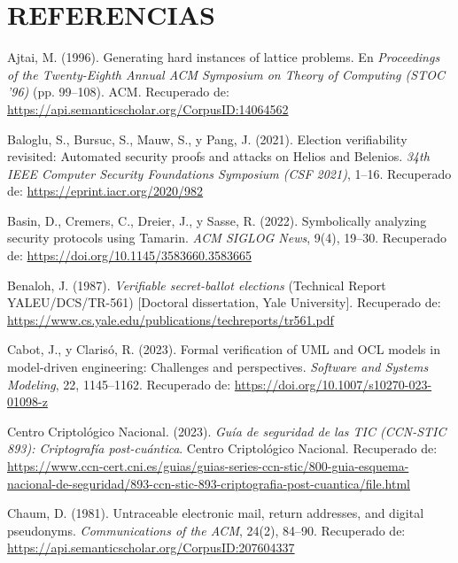 \clearpage
\chapter*{REFERENCIAS}
\begin{flushleft}
	\setlength{\parindent}{0pt}
	\setlength{\parskip}{12pt}

	\hangindent=1.25cm
	Ajtai, M. (1996). Generating hard instances of lattice problems. En \textit{Proceedings of the Twenty-Eighth Annual ACM Symposium on Theory of Computing (STOC '96)} (pp. 99--108). ACM. Recuperado de: \url{https://api.semanticscholar.org/CorpusID:14064562}

	\hangindent=1.25cm
	Baloglu, S., Bursuc, S., Mauw, S., y Pang, J. (2021). Election verifiability revisited: Automated security proofs and attacks on Helios and Belenios. \textit{34th IEEE Computer Security Foundations Symposium (CSF 2021)}, 1--16. Recuperado de: \url{https://eprint.iacr.org/2020/982}

	\hangindent=1.25cm
	Basin, D., Cremers, C., Dreier, J., y Sasse, R. (2022). Symbolically analyzing security protocols using Tamarin. \textit{ACM SIGLOG News}, 9(4), 19--30. Recuperado de: \url{https://doi.org/10.1145/3583660.3583665}

	\hangindent=1.25cm
	Benaloh, J. (1987). \textit{Verifiable secret-ballot elections} (Technical Report YALEU/DCS/TR-561) [Doctoral dissertation, Yale University]. Recuperado de: \url{https://www.cs.yale.edu/publications/techreports/tr561.pdf}

	\hangindent=1.25cm
	Cabot, J., y Clarisó, R. (2023). Formal verification of UML and OCL models in model-driven engineering: Challenges and perspectives. \textit{Software and Systems Modeling}, 22, 1145--1162. Recuperado de: \url{https://doi.org/10.1007/s10270-023-01098-z}

	\hangindent=1.25cm
	Centro Criptológico Nacional. (2023). \textit{Guía de seguridad de las TIC (CCN-STIC 893): Criptografía post-cuántica}. Centro Criptológico Nacional. Recuperado de: \url{https://www.ccn-cert.cni.es/guias/guias-series-ccn-stic/800-guia-esquema-nacional-de-seguridad/893-ccn-stic-893-criptografia-post-cuantica/file.html}

	\hangindent=1.25cm
	Chaum, D. (1981). Untraceable electronic mail, return addresses, and digital pseudonyms. \textit{Communications of the ACM}, 24(2), 84--90. Recuperado de: \url{https://api.semanticscholar.org/CorpusID:207604337}


\end{flushleft}
